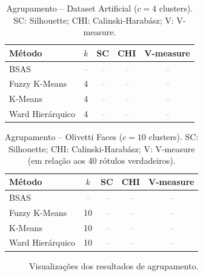 \documentclass[12pt, a4paper]{article}
\newcommand{\placeholder}[1]{\textcolor{gray}{\textit{#1}}}
\begin{document}
\begin{table}[H]
    \centering
    \caption{Agrupamento -- Dataset Artificial ($c=4$ clusters). SC: Silhouette; CHI: Calinski-Harabász; V: V-measure.}
    \label{tab:cluster_artificial}
    \begin{tabular}{lcccc}
        \toprule
        \textbf{Método} & \textbf{$k$} & \textbf{SC} & \textbf{CHI} & \textbf{V-measure} \\
        \midrule
        BSAS             & \placeholder{--} & \placeholder{--} & \placeholder{--} & \placeholder{--} \\
        Fuzzy K-Means    & 4                & \placeholder{--} & \placeholder{--} & \placeholder{--} \\
        K-Means          & 4                & \placeholder{--} & \placeholder{--} & \placeholder{--} \\
        Ward Hierárquico & 4                & \placeholder{--} & \placeholder{--} & \placeholder{--} \\
        \bottomrule
    \end{tabular}
\end{table}

\begin{table}[H]
    \centering
    \caption{Agrupamento -- Olivetti Faces ($c=10$ clusters). SC: Silhouette; CHI: Calinski-Harabász; V: V-measure (em relação aos 40 rótulos verdadeiros).}
    \label{tab:cluster_olivetti}
    \begin{tabular}{lcccc}
        \toprule
        \textbf{Método} & \textbf{$k$} & \textbf{SC} & \textbf{CHI} & \textbf{V-measure} \\
        \midrule
        BSAS             & \placeholder{--} & \placeholder{--} & \placeholder{--} & \placeholder{--} \\
        Fuzzy K-Means    & 10               & \placeholder{--} & \placeholder{--} & \placeholder{--} \\
        K-Means          & 10               & \placeholder{--} & \placeholder{--} & \placeholder{--} \\
        Ward Hierárquico & 10               & \placeholder{--} & \placeholder{--} & \placeholder{--} \\
        \bottomrule
    \end{tabular}
\end{table}

\begin{figure}[H]
    \centering
    \hfill
    \caption{Visualizações dos resultados de agrupamento.}
    \label{fig:cluster_vis}
\end{figure}
\end{document}
